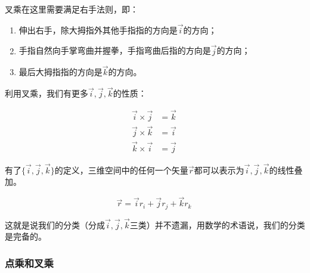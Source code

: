 叉乘在这里需要满足右手法则，即：

\begin{enumerate}
\item 

伸出右手，除大拇指外其他手指指的方向是$\vec i$的方向；

\item

手指自然向手掌弯曲并握拳，手指弯曲后指的方向是$\vec j$的方向；

\item 

最后大拇指指的方向是$\vec k$的方向。

\end{enumerate}

利用叉乘，我们有更多$\vec i , \vec j , \vec k$的性质：

\begin{align}
\vec i \times \vec j & =  \vec k \\
\vec j \times \vec k & =  \vec i \\
\vec k \times \vec i & =  \vec j~
\end{align}

有了$\{ \vec i , \vec j , \vec k  \}$的定义，三维空间中的任何一个矢量$\vec r$都可以表示为$\vec i , \vec j , \vec k$的线性叠加。

\begin{equation}
\vec r =  \vec i  r_i +  \vec j  r_j +  \vec k  r_k~
\end{equation}

这就是说我们的分类（分成$\vec i , \vec j , \vec k$三类）并不遗漏，用数学的术语说，我们的分类是完备的。

\subsubsection{点乘和叉乘}

